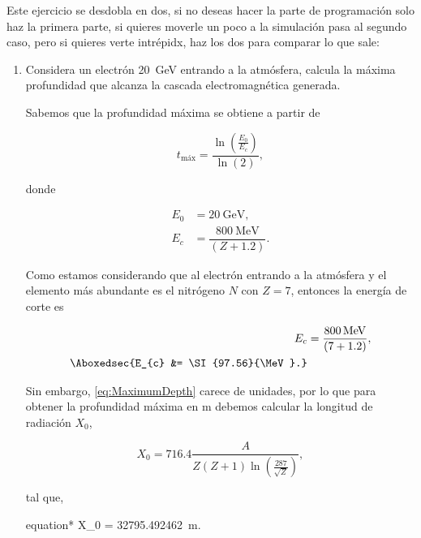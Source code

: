 \documentclass[./../main.tex]{subfiles}
\begin{document}
	\begin{exercise}
		Este ejercicio se desdobla en dos, si no deseas hacer la parte de programación solo haz la primera parte, si quieres moverle un poco a la simulación pasa al segundo caso, pero si quieres verte intrépidx, haz los dos para comparar lo que sale:

		\begin{enumerate}
			\item Considera un electrón \SI{20}{\GeV} entrando a la atmósfera, calcula la máxima profundidad que alcanza la cascada electromagnética generada.
			
			\begin{solution}
				Sabemos que la profundidad máxima se obtiene a partir de 

				\begin{equation}
					t_{\text{máx}} = \dfrac{\ln\left(\tfrac{E_{0}}{E_{c}}\right)}{\ln(2)},
					\label{eq:MaximumDepth}
				\end{equation}

				donde

				\begin{align*}
					E_{0} &= \SI{20}{\GeV},\\
					E_{c} &= \dfrac{\SI{800}{\MeV}}{(Z + 1.2)}.
				\end{align*}

				Como estamos considerando que al electrón entrando a la atmósfera y el elemento más abundante es el nitrógeno \(N\) con \(Z = 7\), entonces la energía de corte es

				\begin{align*}
					E_{c} &= \dfrac{\SI{800}{\MeV}}{(7 + 1.2)},\\
					\Aboxedsec{E_{c} &= \SI{97.56}{\MeV}.}
				\end{align*}

				Sin embargo, \cref{eq:MaximumDepth} carece de unidades, por lo que para obtener la profundidad máxima en \unit{\m} debemos calcular la longitud de radiación \(X_{0}\),

				\begin{equation*}
					X_{0} = 716.4 \dfrac{A}{Z(Z + 1)\ln\left(\tfrac{287}{\sqrt{Z}}\right)},
				\end{equation*}

				tal que,

				\begin{empheq}[box = \color{customBlue}\fbox]{equation*}
					X_{0} = \SI{32795.492462}{\m}.
				\end{empheq}


\end{solution}
\end{enumerate}
\end{exercise}
\end{document}
